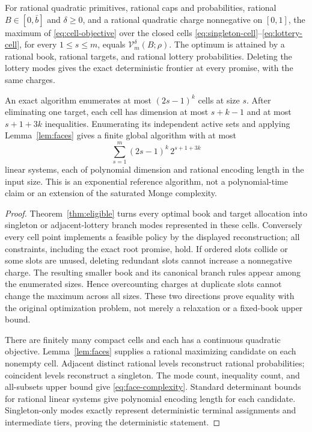 \begin{theorem}\label{thm:continuous}
For rational quadratic primitives, rational caps and probabilities, rational $B\in[0,\bar b]$ and $\delta\geq0$, and a rational quadratic charge nonnegative on $[0,1]$, the maximum of \eqref{eq:cell-objective} over the closed cells \eqref{eq:singleton-cell}--\eqref{eq:lottery-cell}, for every $1\leq s\leq m$, equals $\mathcal V_m^\delta(B;\rho)$. The optimum is attained by a rational book, rational targets, and rational lottery probabilities. Deleting the lottery modes gives the exact deterministic frontier at every promise, with the same charges.

An exact algorithm enumerates at most $(2s-1)^k$ cells at size $s$. After eliminating one target, each cell has dimension at most $s+k-1$ and at most $s+1+3k$ inequalities. Enumerating its independent active sets and applying Lemma~\ref{lem:faces} gives a finite global algorithm with at most
\begin{equation}\label{eq:face-complexity}
 \sum_{s=1}^m (2s-1)^k\,2^{s+1+3k}
\end{equation}
linear systems, each of polynomial dimension and rational encoding length in the input size. This is an exponential reference algorithm, not a polynomial-time claim or an extension of the saturated Monge complexity.
\end{theorem}
\begin{proof}
Theorem~\ref{thm:eligible} turns every optimal book and target allocation into singleton or adjacent-lottery branch modes represented in these cells. Conversely every cell point implements a feasible policy by the displayed reconstruction; all constraints, including the exact root promise, hold. If ordered slots collide or some slots are unused, deleting redundant slots cannot increase a nonnegative charge. The resulting smaller book and its canonical branch rules appear among the enumerated sizes. Hence overcounting charges at duplicate slots cannot change the maximum across all sizes. These two directions prove equality with the original optimization problem, not merely a relaxation or a fixed-book upper bound.

There are finitely many compact cells and each has a continuous quadratic objective. Lemma~\ref{lem:faces} supplies a rational maximizing candidate on each nonempty cell. Adjacent distinct rational levels reconstruct rational probabilities; coincident levels reconstruct a singleton. The mode count, inequality count, and all-subsets upper bound give \eqref{eq:face-complexity}. Standard determinant bounds for rational linear systems give polynomial encoding length for each candidate. Singleton-only modes exactly represent deterministic terminal assignments and intermediate tiers, proving the deterministic statement.
\end{proof}

